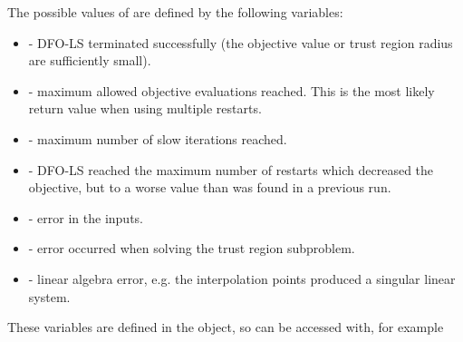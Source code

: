 \documentclass[letterpaper,10pt,english]{sphinxmanual}
\begin{document}
The possible values of  are defined by the following variables:
\begin{itemize}
\item {} 
 - DFO-LS terminated successfully (the objective value or trust region radius are sufficiently small).

\item {} 
 - maximum allowed objective evaluations reached. This is the most likely return value when using multiple restarts.

\item {} 
 - maximum number of slow iterations reached.

\item {} 
 - DFO-LS reached the maximum number of restarts which decreased the objective, but to a worse value than was found in a previous run.

\item {} 
 - error in the inputs.

\item {} 
 - error occurred when solving the trust region subproblem.

\item {} 
 - linear algebra error, e.g. the interpolation points produced a singular linear system.

\end{itemize}

These variables are defined in the  object, so can be accessed with, for example
\begin{quote}

\begin{sphinxVerbatim}[commandchars=\\\{\}]
   
\end{sphinxVerbatim}
\end{quote}
\end{document}
